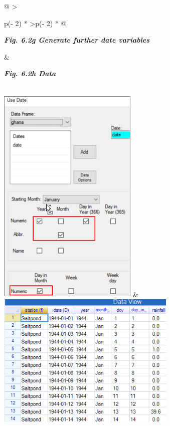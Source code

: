 \documentclass[
  letterpaper,
  DIV=11,
  numbers=noendperiod]{scrreprt}
\begin{document}
\begin{longtable}[]{@{}
  >{\raggedright\arraybackslash}p{(\columnwidth - 2\tabcolsep) * }
  >{\centering\arraybackslash}p{(\columnwidth - 2\tabcolsep) * }@{}}
\toprule\noalign{}
\begin{minipage}[b]{\linewidth}\raggedright
\textbf{\emph{Fig. 6.2g Generate further date variables}}
\end{minipage} & \begin{minipage}[b]{\linewidth}\centering
\textbf{\emph{Fig. 6.2h Data}}
\end{minipage} \\
\midrule\noalign{}
\endhead
\bottomrule\noalign{}
\endlastfoot
\includegraphics[width=2.62646in,height=4.18969in]{figures/Fig6.2g.png}
&
\includegraphics[width=3.36829in,height=2.54636in]{figures/Fig6.2h.png} \\
\end{longtable}
\end{document}

